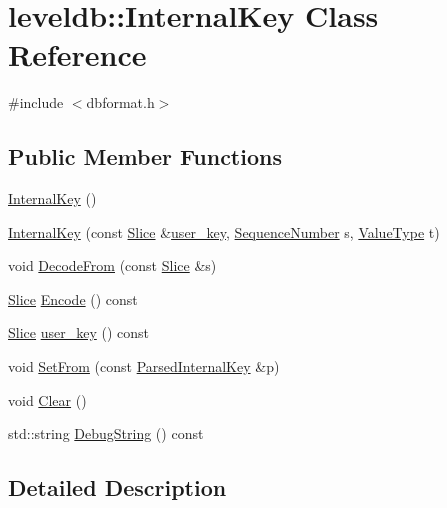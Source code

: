 \hypertarget{classleveldb_1_1_internal_key}{}\section{leveldb\+:\+:Internal\+Key Class Reference}
\label{classleveldb_1_1_internal_key}


{\ttfamily \#include $<$dbformat.\+h$>$}

\subsection*{Public Member Functions}
\begin{DoxyCompactItemize}
\item 
\hyperlink{classleveldb_1_1_internal_key_a277b997aadb14d0a65314187a1e6adf6}{Internal\+Key} ()
\item 
\hyperlink{classleveldb_1_1_internal_key_af436814d1667db55e93b6bd583619617}{Internal\+Key} (const \hyperlink{classleveldb_1_1_slice}{Slice} \&\hyperlink{classleveldb_1_1_internal_key_a8eeee76862e806006549784fe21fff61}{user\+\_\+key}, \hyperlink{namespaceleveldb_a5481ededd221c36d652c371249f869fa}{Sequence\+Number} s, \hyperlink{namespaceleveldb_acc038cb0d608414730cafa459a4ba866}{Value\+Type} t)
\item 
void \hyperlink{classleveldb_1_1_internal_key_a5a8c9bced0ba968b6b62d91cfb19a82a}{Decode\+From} (const \hyperlink{classleveldb_1_1_slice}{Slice} \&s)
\item 
\hyperlink{classleveldb_1_1_slice}{Slice} \hyperlink{classleveldb_1_1_internal_key_aed986eb7cb360bd6955097235ad267b6}{Encode} () const 
\item 
\hyperlink{classleveldb_1_1_slice}{Slice} \hyperlink{classleveldb_1_1_internal_key_a8eeee76862e806006549784fe21fff61}{user\+\_\+key} () const 
\item 
void \hyperlink{classleveldb_1_1_internal_key_ada9566cd92b6b9784ab7f2f6f71d0a4e}{Set\+From} (const \hyperlink{structleveldb_1_1_parsed_internal_key}{Parsed\+Internal\+Key} \&p)
\item 
void \hyperlink{classleveldb_1_1_internal_key_ab6e9ebec1bf567de89d8dd34fdc51f86}{Clear} ()
\item 
std\+::string \hyperlink{classleveldb_1_1_internal_key_a737053e1b02c3eb8361e960f7fe5befb}{Debug\+String} () const 
\end{DoxyCompactItemize}


\subsection{Detailed Description}


